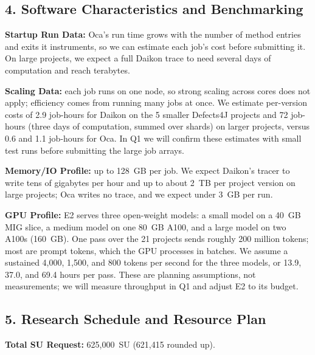 \documentclass{article}
\begin{document}
\subsection*{4. Software Characteristics and Benchmarking}
\textbf{Startup Run Data:} Oca's run time grows with the number of method entries and exits it instruments, so we can estimate each job's cost before submitting it.
On large projects, we expect a full Daikon trace to need several days of computation and reach terabytes.

\textbf{Scaling Data:} each job runs on one node, so strong scaling across cores does not apply; efficiency comes from running many jobs at once.
We estimate per-version costs of 2.9 job-hours for Daikon on the 5 smaller Defects4J projects and 72 job-hours (three days of computation, summed over shards) on larger projects, versus 0.6 and 1.1 job-hours for Oca.
In Q1 we will confirm these estimates with small test runs before submitting the large job arrays.

\textbf{Memory/IO Profile:} up to 128~GB per job.
We expect Daikon's tracer to write tens of gigabytes per hour and up to about 2~TB per project version on large projects; Oca writes no trace, and we expect under 3~GB per run.

\textbf{GPU Profile:} E2 serves three open-weight models: a small model on a 40~GB MIG slice, a medium model on one 80~GB A100, and a large model on two A100s (160~GB).
One pass over the 21 projects sends roughly 200 million tokens; most are prompt tokens, which the GPU processes in batches.
We assume a sustained 4,000, 1,500, and 800 tokens per second for the three models, or 13.9, 37.0, and 69.4 hours per pass.
These are planning assumptions, not measurements; we will measure throughput in Q1 and adjust E2 to its budget.

\subsection*{5. Research Schedule and Resource Plan}
\textbf{Total SU Request:} 625,000~SU (621,415 rounded up).
\end{document}
